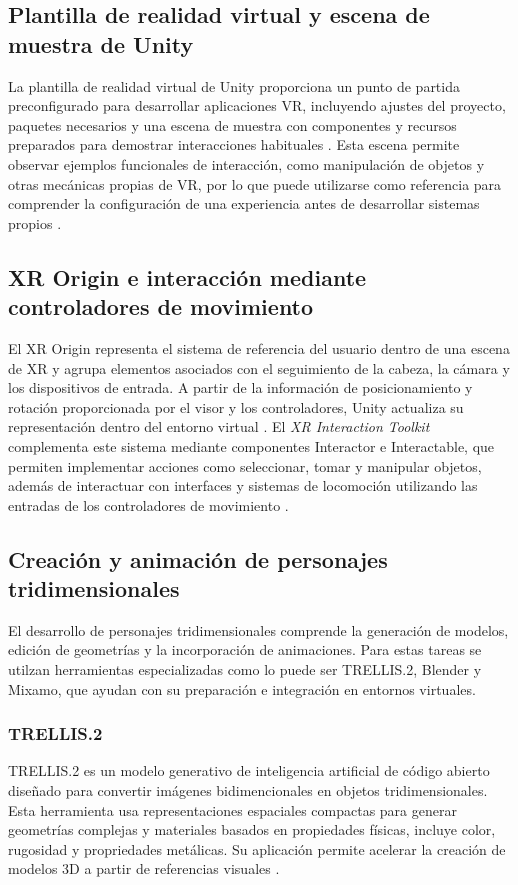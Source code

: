 \subsection{Plantilla de realidad virtual y escena de muestra de Unity}
La plantilla de realidad virtual de Unity proporciona un punto de partida preconfigurado para desarrollar aplicaciones VR, incluyendo ajustes del proyecto, paquetes necesarios y una escena de muestra con componentes y recursos preparados para demostrar interacciones habituales \cite{unity2026vroverview}. Esta escena permite observar ejemplos funcionales de interacción, como manipulación de objetos y otras mecánicas propias de VR, por lo que puede utilizarse como referencia para comprender la configuración de una experiencia antes de desarrollar sistemas propios \cite{unity2026vrtemplate}.
\subsection{XR Origin e interacción mediante controladores de movimiento}
El XR Origin representa el sistema de referencia del usuario dentro de una escena de XR y agrupa elementos asociados con el seguimiento de la cabeza, la cámara y los dispositivos de entrada. A partir de la información de posicionamiento y rotación proporcionada por el visor y los controladores, Unity actualiza su representación dentro del entorno virtual \cite{unity2026xritoolkit}. El \emph{XR Interaction Toolkit} complementa este sistema mediante componentes Interactor e Interactable, que permiten implementar acciones como seleccionar, tomar y manipular objetos, además de interactuar con interfaces y sistemas de locomoción utilizando las entradas de los controladores de movimiento \cite{unity2026xritoolkit,unity2026xrinput}.
\subsection{Creación y animación de personajes tridimensionales}
El desarrollo de personajes tridimensionales comprende la generación de modelos, edición de geometrías y la incorporación de animaciones. Para estas tareas se utilzan herramientas especializadas como lo puede ser TRELLIS.2, Blender y Mixamo, que ayudan con su preparación e integración en entornos virtuales.
\subsubsection{TRELLIS.2}
TRELLIS.2 es un modelo generativo de inteligencia artificial de código abierto diseñado para convertir imágenes bidimencionales en objetos tridimensionales. Esta herramienta usa representaciones espaciales compactas para generar geometrías complejas y materiales basados en propiedades físicas, incluye color, rugosidad y propriedades metálicas. Su aplicación permite acelerar la creación de modelos 3D a partir de referencias visuales \cite{xiang2025trellis2}.
